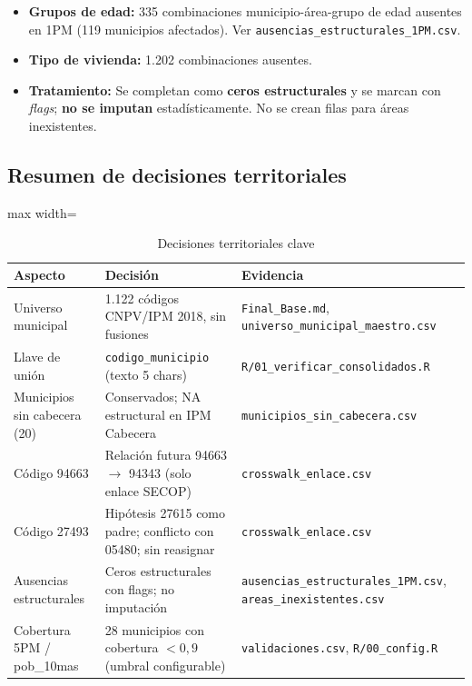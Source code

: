 \begin{itemize}
    \item \textbf{Grupos de edad:} 335 combinaciones municipio-área-grupo de edad ausentes en 1PM (119 municipios afectados). Ver \texttt{ausencias\_estructurales\_1PM.csv}.
    \item \textbf{Tipo de vivienda:} 1.202 combinaciones ausentes.
    \item \textbf{Tratamiento:} Se completan como \textbf{ceros estructurales} y se marcan con \textit{flags}; \textbf{no se imputan} estadísticamente. No se crean filas para áreas inexistentes.
\end{itemize}

\subsection{Resumen de decisiones territoriales}
\label{sec:resumen_territorial}

\begin{table}[htbp]
\centering
\caption{Decisiones territoriales clave}
\label{tab:decisiones_territoriales}
\begin{adjustbox}{max width=\textwidth}
\begin{tabular}{@{}lll@{}}
\toprule
\textbf{Aspecto} & \textbf{Decisión} & \textbf{Evidencia} \\
\midrule
Universo municipal & 1.122 códigos CNPV/IPM 2018, sin fusiones & \texttt{Final\_Base.md}, \texttt{universo\_municipal\_maestro.csv} \\
Llave de unión & \texttt{codigo\_municipio} (texto 5 chars) & \texttt{R/01\_verificar\_consolidados.R} \\
Municipios sin cabecera (20) & Conservados; NA estructural en IPM Cabecera & \texttt{municipios\_sin\_cabecera.csv} \\
Código 94663 & Relación futura 94663 $\rightarrow$ 94343 (solo enlace SECOP) & \texttt{crosswalk\_enlace.csv} \\
Código 27493 & Hipótesis 27615 como padre; conflicto con 05480; sin reasignar & \texttt{crosswalk\_enlace.csv} \\
Ausencias estructurales & Ceros estructurales con flags; no imputación & \texttt{ausencias\_estructurales\_1PM.csv}, \texttt{areas\_inexistentes.csv} \\
Cobertura 5PM / pob\_10mas & 28 municipios con cobertura $<0,9$ (umbral configurable) & \texttt{validaciones.csv}, \texttt{R/00\_config.R} \\
\bottomrule
\end{tabular}
\end{adjustbox}
\end{table}



